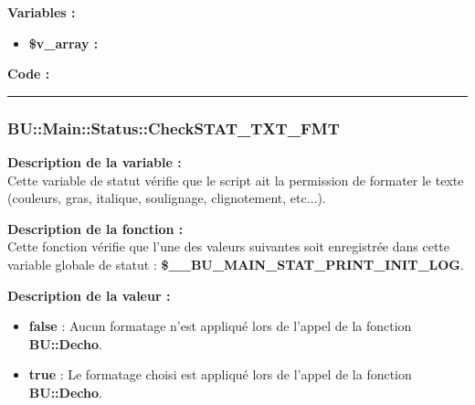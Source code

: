\documentclass[a4paper,10pt]{article}
\begin{document}
\begin{justify}
    \textbf{Variables :}

    \begin{itemize}
        \item \textbf{\color{orange}\$v\_array\color{white} :}
    \end{itemize}
\end{justify}

\begin{justify}
    \textbf{Code :}
\end{justify}



\color{blue}\par\noindent\rule{\textwidth}{0.4pt}\color{white}

\color{blue}
\subsubsection{\color{mauve}BU::Main::Status::CheckSTAT\_TXT\_FMT}\color{white}

\begin{justify}
    \textbf{Description de la variable :}\\
    Cette variable de statut vérifie que le script ait la permission de formater le texte (couleurs, gras, italique, soulignage, clignotement, etc...).
\end{justify}

\begin{justify}
    \textbf{Description de la fonction :}\\
    Cette fonction vérifie que l'une des valeurs suivantes soit enregistrée dans cette variable globale de statut : \textbf{\color{orange}\$\_\_BU\_MAIN\_STAT\_PRINT\_INIT\_LOG}.
\end{justify}

\begin{justify}
    \textbf{Description de la valeur :}

    \begin{itemize}
        \item \textbf{false} : Aucun formatage n'est appliqué lors de l'appel de la fonction \textbf{\color{mauve}BU::Decho}.\\

        \item \textbf{true} : Le formatage choisi est appliqué lors de l'appel de la fonction \textbf{\color{mauve}BU::Decho}.
    \end{itemize}

\end{justify}
\end{document}
